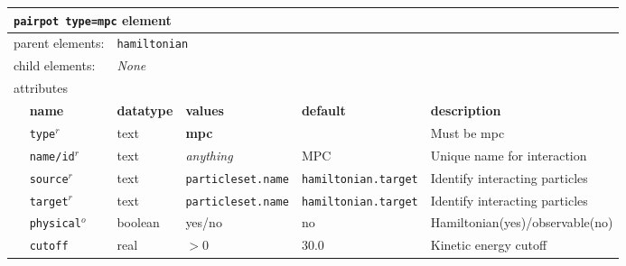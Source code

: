 \FloatBarrier
\begin{table}[h]
\begin{center}
\begin{tabularx}{\textwidth}{l l l l l l }
\hline
\multicolumn{6}{l}{\texttt{pairpot type=mpc} element} \\
\hline
\multicolumn{2}{l}{parent elements:} & \multicolumn{4}{l}{\texttt{hamiltonian}}\\
\multicolumn{2}{l}{child  elements:} & \multicolumn{4}{l}{\textit{None}}\\
\multicolumn{2}{l}{attributes}  & \multicolumn{4}{l}{}\\
   &   \bfseries name     & \bfseries datatype & \bfseries values & \bfseries default   & \bfseries description \\
   & \texttt{type}$^r$    &  text              & \textbf{mpc}     &                     & Must be mpc         \\
   & \texttt{name/id}$^r$ &  text              & \textit{anything}&  MPC                & Unique name for interaction \\
   & \texttt{source}$^r$  &  text              & \texttt{particleset.name} &\texttt{hamiltonian.target}& Identify interacting particles\\
   & \texttt{target}$^r$  &  text              & \texttt{particleset.name} &\texttt{hamiltonian.target}& Identify interacting particles  \\
   & \texttt{physical}$^o$&  boolean           & yes/no           & no                  & Hamiltonian(yes)/observable(no) \\
   &  \texttt{cutoff}     &  real              & $>0$             & 30.0                & Kinetic energy cutoff \\
  \hline
\end{tabularx}
\end{center}
\end{table}
